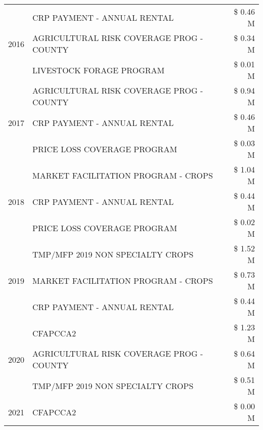 \begin{tabular}{llr}
\cline{1-3}
\multirow[t]{3}{*}{2016} & CRP PAYMENT - ANNUAL RENTAL                   & \$ 0.46 M \\
 & AGRICULTURAL RISK COVERAGE PROG - COUNTY      & \$ 0.34 M \\
 & LIVESTOCK FORAGE PROGRAM                      & \$ 0.01 M \\
\cline{1-3}
\multirow[t]{3}{*}{2017} & AGRICULTURAL RISK COVERAGE PROG - COUNTY & \$ 0.94 M \\
 & CRP PAYMENT - ANNUAL RENTAL & \$ 0.46 M \\
 & PRICE LOSS COVERAGE PROGRAM & \$ 0.03 M \\
\cline{1-3}
\multirow[t]{3}{*}{2018} & MARKET FACILITATION PROGRAM - CROPS & \$ 1.04 M \\
 & CRP PAYMENT - ANNUAL RENTAL & \$ 0.44 M \\
 & PRICE LOSS COVERAGE PROGRAM & \$ 0.02 M \\
\cline{1-3}
\multirow[t]{3}{*}{2019} & TMP/MFP 2019 NON SPECIALTY CROPS & \$ 1.52 M \\
 & MARKET FACILITATION PROGRAM - CROPS & \$ 0.73 M \\
 & CRP PAYMENT - ANNUAL RENTAL & \$ 0.44 M \\
\cline{1-3}
\multirow[t]{3}{*}{2020} & CFAPCCA2 & \$ 1.23 M \\
 & AGRICULTURAL RISK COVERAGE PROG - COUNTY & \$ 0.64 M \\
 & TMP/MFP 2019 NON SPECIALTY CROPS & \$ 0.51 M \\
\cline{1-3}
2021 & CFAPCCA2 & \$ 0.00 M \\
\cline{1-3}
\bottomrule
\end{tabular}
